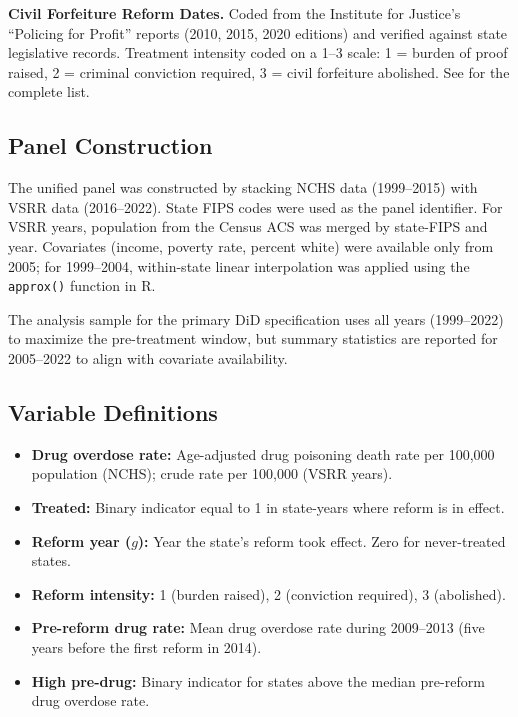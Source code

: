 \documentclass[12pt]{article}
\begin{document}
\textbf{Civil Forfeiture Reform Dates.} Coded from the Institute for Justice's ``Policing for Profit'' reports (2010, 2015, 2020 editions) and verified against state legislative records. Treatment intensity coded on a 1--3 scale: 1 = burden of proof raised, 2 = criminal conviction required, 3 = civil forfeiture abolished. See  for the complete list.

\subsection{Panel Construction}

The unified panel was constructed by stacking NCHS data (1999--2015) with VSRR data (2016--2022). State FIPS codes were used as the panel identifier. For VSRR years, population from the Census ACS was merged by state-FIPS and year. Covariates (income, poverty rate, percent white) were available only from 2005; for 1999--2004, within-state linear interpolation was applied using the \texttt{approx()} function in R.

The analysis sample for the primary DiD specification uses all years (1999--2022) to maximize the pre-treatment window, but summary statistics are reported for 2005--2022 to align with covariate availability.

\subsection{Variable Definitions}

\begin{itemize}
\item \textbf{Drug overdose rate:} Age-adjusted drug poisoning death rate per 100,000 population (NCHS); crude rate per 100,000 (VSRR years).
\item \textbf{Treated:} Binary indicator equal to 1 in state-years where reform is in effect.
\item \textbf{Reform year ($g$):} Year the state's reform took effect. Zero for never-treated states.
\item \textbf{Reform intensity:} 1 (burden raised), 2 (conviction required), 3 (abolished).
\item \textbf{Pre-reform drug rate:} Mean drug overdose rate during 2009--2013 (five years before the first reform in 2014).
\item \textbf{High pre-drug:} Binary indicator for states above the median pre-reform drug overdose rate.
\end{itemize}
\end{document}
